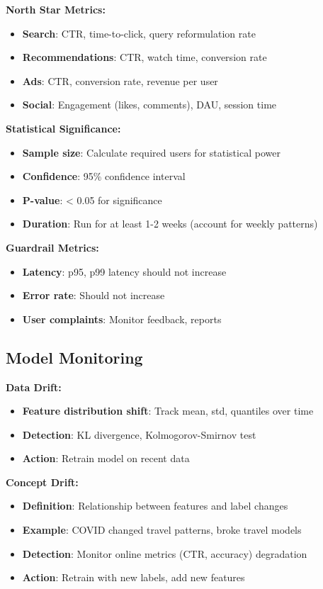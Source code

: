 \documentclass[8pt,landscape]{article}
\begin{document}
\begin{multicols}{3}
\textbf{North Star Metrics:}
\begin{itemize}
\item \textbf{Search}: CTR, time-to-click, query reformulation rate
\item \textbf{Recommendations}: CTR, watch time, conversion rate
\item \textbf{Ads}: CTR, conversion rate, revenue per user
\item \textbf{Social}: Engagement (likes, comments), DAU, session time
\end{itemize}

\textbf{Statistical Significance:}
\begin{itemize}
\item \textbf{Sample size}: Calculate required users for statistical power
\item \textbf{Confidence}: 95\% confidence interval
\item \textbf{P-value}: < 0.05 for significance
\item \textbf{Duration}: Run for at least 1-2 weeks (account for weekly patterns)
\end{itemize}

\textbf{Guardrail Metrics:}
\begin{itemize}
\item \textbf{Latency}: p95, p99 latency should not increase
\item \textbf{Error rate}: Should not increase
\item \textbf{User complaints}: Monitor feedback, reports
\end{itemize}

\subsection*{Model Monitoring}

\textbf{Data Drift:}
\begin{itemize}
\item \textbf{Feature distribution shift}: Track mean, std, quantiles over time
\item \textbf{Detection}: KL divergence, Kolmogorov-Smirnov test
\item \textbf{Action}: Retrain model on recent data
\end{itemize}

\textbf{Concept Drift:}
\begin{itemize}
\item \textbf{Definition}: Relationship between features and label changes
\item \textbf{Example}: COVID changed travel patterns, broke travel models
\item \textbf{Detection}: Monitor online metrics (CTR, accuracy) degradation
\item \textbf{Action}: Retrain with new labels, add new features
\end{itemize}


\end{multicols}
\end{document}
